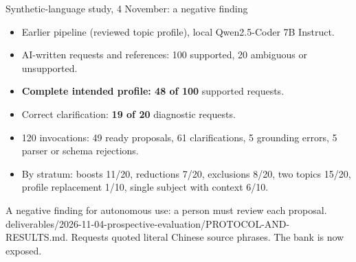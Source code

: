 \documentclass[10pt]{beamer}
\newcommand{\src}[1]{\vfill{\tiny\color{bcitgray}#1}}
\begin{document}
\begin{frame}{Synthetic-language study, 4 November: a negative finding}
\small
\begin{itemize}
\item Earlier pipeline (reviewed topic profile), local Qwen2.5-Coder 7B Instruct.
\item AI-written requests and references: 100 supported, 20 ambiguous or unsupported.
\item \textbf{Complete intended profile: 48 of 100} supported requests.
\item Correct clarification: \textbf{19 of 20} diagnostic requests.
\item 120 invocations: 49 ready proposals, 61 clarifications, 5 grounding errors, 5 parser or schema rejections.
\item By stratum: boosts 11/20, reductions 7/20, exclusions 8/20, two topics 15/20, profile replacement 1/10, single subject with context 6/10.
\end{itemize}
\vspace{0.1cm}
A negative finding for autonomous use: a person must review each proposal.
\src{deliverables/2026-11-04-prospective-evaluation/PROTOCOL-AND-RESULTS.md. Requests quoted literal Chinese source phrases. The bank is now exposed.}
\end{frame}
\end{document}

